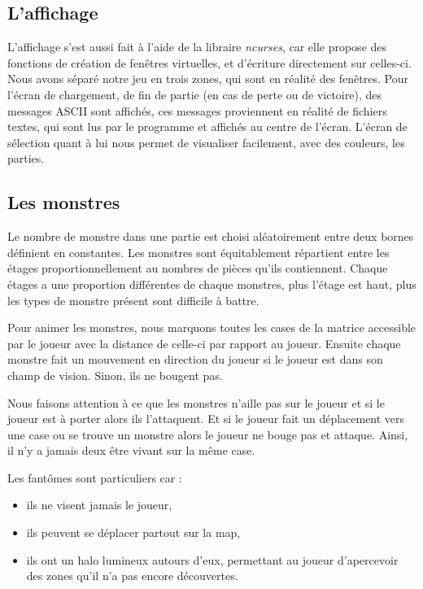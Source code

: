 \documentclass[11pt]{report}
\begin{document}
			
		\subsection{L'affichage}
		
		L'affichage s'est aussi fait à l'aide de la libraire \emph{ncurses}, car elle propose des fonctions de création de fenêtres virtuelles, et d'écriture directement sur celles-ci. Nous avons séparé notre jeu en trois zones, qui sont en réalité des fenêtres. Pour l'écran de chargement, de fin de partie (en cas de perte ou de victoire), des messages ASCII sont affichés, ces messages proviennent en réalité de fichiers textes, qui sont lus par le programme et affichés au centre de l'écran. L'écran de sélection quant à lui nous permet de visualiser facilement, avec des couleurs, les parties. 
		
		\subsection{Les monstres}
		
		Le nombre de monstre dans une partie est choisi aléatoirement entre deux bornes définient en constantes.
		Les monstres sont équitablement répartient entre les étages proportionnellement au nombres de pièces qu'ils contiennent. Chaque étages a une proportion différentes de chaque monstres, plus l'étage est haut, plus les types de monstre présent sont difficile à battre.
		
		Pour animer les monstres, nous marquons toutes les cases de la matrice accessible par le joueur avec la distance de celle-ci par rapport au joueur. Ensuite chaque monstre fait un mouvement en direction du joueur si le joueur est dans son champ de vision. Sinon, ils ne bougent pas.
		
		Nous faisons attention à ce que les monstres n'aille pas sur le joueur et si le joueur est à porter alors ils l'attaquent. Et si le joueur fait un déplacement vers une case ou se trouve un monstre alors le joueur ne bouge pas et attaque. Ainsi, il n'y a jamais deux être vivant sur la même case.
		
		Les fantômes sont particuliers car :
		\begin{itemize}
			\item ils ne visent jamais le joueur,
			\item ils peuvent se déplacer partout sur la map,
			\item ils ont un halo lumineux autours d'eux, permettant au joueur d'apercevoir des zones qu'il n'a pas encore découvertes.
		\end{itemize}
		
\end{document}
